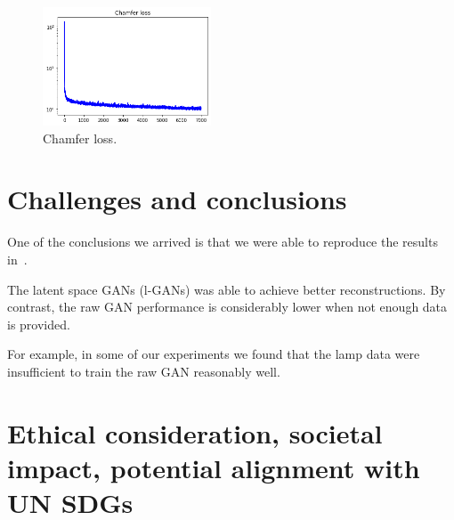 \documentclass[12pt]{article}
\newcommand{\contentdescription}[1]{}
\begin{document}
    \begin{figure}
        \centering
        \includegraphics[width = 50mm]{chamfer-loss}
        \caption{Chamfer loss.}
    \end{figure}


    \section{Challenges and conclusions}
    \contentdescription{
        Challenges and Conclusions (5-15\%):
        Challenges you faced when reimplementing the paper and conducting the experiments.
        Were all details in the paper?
        Or did you have to look in the authors code or even contact them to find about some details?
        Was parts of the code quite hard to get them to work as intended?
        Did you have optimize and tune several hyperparameters?
        Which ones?
        Did the framework you used make the implementation difficult in some ways?

        Summarize your key results - what have you learned?
        What points do you think one should consider when using the approach of the paper you chose for your project?
        Suggest ideas for future extensions or new applications of your ideas.
    }

    One of the conclusions we arrived is that we were able to reproduce the results in~\cite{pmlr-v80-achlioptas18a}.

    The latent space GANs (l-GANs) was able to achieve better reconstructions.
    By contrast, the raw GAN performance is considerably lower when not enough data is provided.

    For example, in some of our experiments we found that the lamp data were insufficient to train the raw GAN reasonably well.


    \section{Ethical consideration, societal impact, potential alignment with UN SDGs}
    \contentdescription{
        Ethical consideration, societal impact, potential alignment with UN SDGs (5-10\%):
        Think and research!
        Are there any ethical considerations for the original paper, its problem or method, its way of conducting experiments?
        How about your task, your datasets, and the experiments you did?
        What societal impact can you imagine about the original paper and its contributions and results?
        How about your project report?
        How do you think this paper can push the UN SDG targets?
    }
\end{document}
